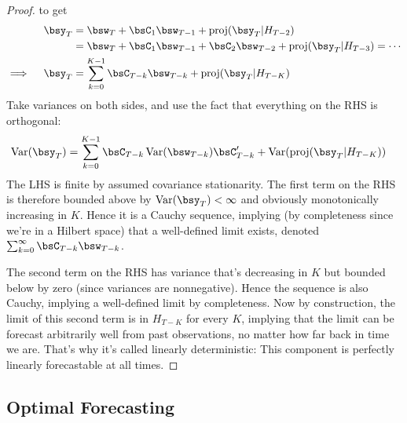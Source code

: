 \documentclass[12pt]{article}
\theoremstyle{plain}
\theoremstyle{definition}
\theoremstyle{remark}
\newcommand{\Var}{\operatorname{Var}}
\newcommand{\proj}{\operatorname{proj}}
\begin{document}
\begin{proof}
to get
\begin{align*}
  \bsy_T
  &=
  \bsw_T + \bsC_1\bsw_{T-1}
  + \proj(\bsy_T|H_{T-2})
  \\
  &=
  \bsw_T + \bsC_1\bsw_{T-1}
  + \bsC_2\bsw_{T-2}
  + \proj(\bsy_T|H_{T-3})
  =\cdots
  \\
  \implies\quad
  \bsy_T
  &=
  \sum_{k=0}^{K-1} \bsC_{T-k}\bsw_{T-k}
  + \proj(\bsy_T|H_{T-K})
\end{align*}
Take variances on both sides, and use the fact that everything on the
RHS is orthogonal:
\begin{align*}
  \Var(\bsy_T)
  &=
  \sum_{k=0}^{K-1} \bsC_{T-k}\Var(\bsw_{T-k})\bsC_{T-k}'
  + \Var(\proj(\bsy_T|H_{T-K}))
\end{align*}
The LHS is finite by assumed covariance stationarity. The first term on
the RHS is therefore bounded above by $\Var(\bsy_T)<\infty$ and
obviously monotonically increasing in $K$. Hence it is a Cauchy
sequence, implying (by completeness since we're in a Hilbert space) that
a well-defined limit exists, denoted
$\sum_{k=0}^\infty \bsC_{T-k}\bsw_{T-k}$.

The second term on the RHS has variance that's decreasing in $K$ but
bounded below by zero (since variances are nonnegative).
Hence the sequence is also Cauchy, implying a well-defined limit by
completeness.
Now by construction, the limit of this second term is in $H_{T-K}$ for
every $K$, implying that the limit can be forecast arbitrarily well from
past observations, no matter how far back in time we are.
That's why it's called linearly deterministic: This component is
perfectly linearly forecastable at all times.
\end{proof}



\clearpage
\subsection{Optimal Forecasting}
\end{document}
